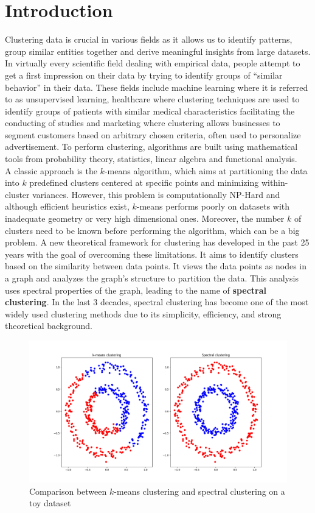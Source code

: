 \documentclass[a4paper,12pt]{article}
\theoremstyle{definition}
\theoremstyle{plain}
\begin{document}
\section{Introduction}
Clustering data is crucial in various fields as it allows us to identify patterns, group similar entities together and derive meaningful insights from large datasets. In virtually every
scientific field dealing with empirical data, people attempt to get a first impression on their data by
trying to identify groups of “similar behavior” in their data. These fields include machine learning where it is referred to as unsupervised learning, healthcare where clustering techniques are used to identify groups of patients with similar medical characteristics facilitating the conducting of studies and marketing where clustering allows businesses to segment customers based on arbitrary chosen criteria, often used to personalize advertisement. To perform clustering, algorithms are built using mathematical tools from probability theory, statistics, linear algebra and functional analysis.\\ A classic approach is the $k$-means algorithm, which aims at partitioning the data into $k$ predefined clusters centered at specific points and minimizing within-cluster variances. However, this problem is computationally NP-Hard and although efficient heuristics exist, $k$-means performs poorly on datasets with inadequate geometry or very high dimensional ones. Moreover, the number $k$ of clusters need to be known before performing the algorithm, which can be a big problem.
A new theoretical framework for clustering has developed in the past 25 years with the goal of overcoming these limitations. It aims to identify clusters based on the similarity between data points. It views the data points as nodes in a graph and analyzes the graph's structure to partition the data. This analysis uses spectral properties of the graph, leading to the name of \textbf{spectral clustering}.
In the last 3 decades, spectral clustering has become one of the most widely used clustering methods  due to its simplicity, efficiency, and strong theoretical background.
\begin{figure}[H]
	\centering
	\includegraphics[width=0.7\linewidth]{figures/Fig1}
	\caption{Comparison between $k$-means clustering and spectral clustering on a toy dataset}
	\label{fig:fig1}
\end{figure}
\end{document}
